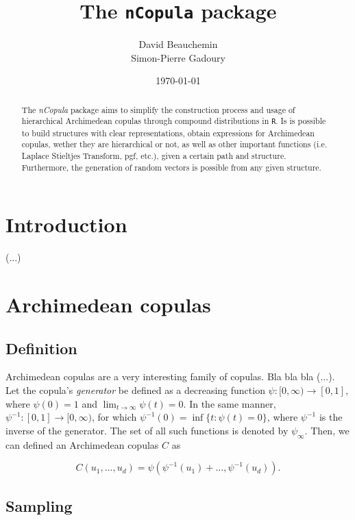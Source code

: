 \documentclass[11pt, english]{article}\usepackage[]{graphicx}\usepackage[]{color}
\title{The \texttt{nCopula} package}
\author{David Beauchemin \\ Simon-Pierre Gadoury}
\date{\today}
\begin{document}
\maketitle

\begin{abstract}
The \emph{nCopula} package aims to simplify the construction process and usage of hierarchical Archimedean copulas through compound distributions in \texttt{R}. Is is possible to build structures with clear representations, obtain expressions for Archimedean copulas, wether they are hierarchical or not, as well as other important functions (i.e. Laplace Stieltjes Transform, pgf, etc.), given a certain path and structure. Furthermore, the generation of random vectors is possible from any given structure.
\end{abstract}

\tableofcontents

\section{Introduction}

(...)

\section{Archimedean copulas}

\subsection{Definition}

Archimedean copulas are a very interesting family of copulas. Bla bla bla (...). \\

Let the copula's \emph{generator} be defined as a decreasing function $\psi : [0, \infty) \to [0, 1]$, where $\psi(0) = 1$ and $\lim_{t \to \infty} \psi(t) = 0$. In the same manner, $\psi^{-1} : [0, 1] \to [0, \infty)$, for which $\psi^{-1}(0) = \inf\{t : \psi(t) = 0\}$, where $\psi^{-1}$ is the inverse of the generator. The set of all such functions is denoted by $\psi_\infty$. Then, we can defined an Archimedean copulas $C$ as

\begin{equation}
  C(u_1, \ldots, u_d) = \psi \left( \psi^{-1}(u_1) + \ldots, \psi^{-1}(u_d) \right).
\end{equation}

\subsection{Sampling}
\end{document}
